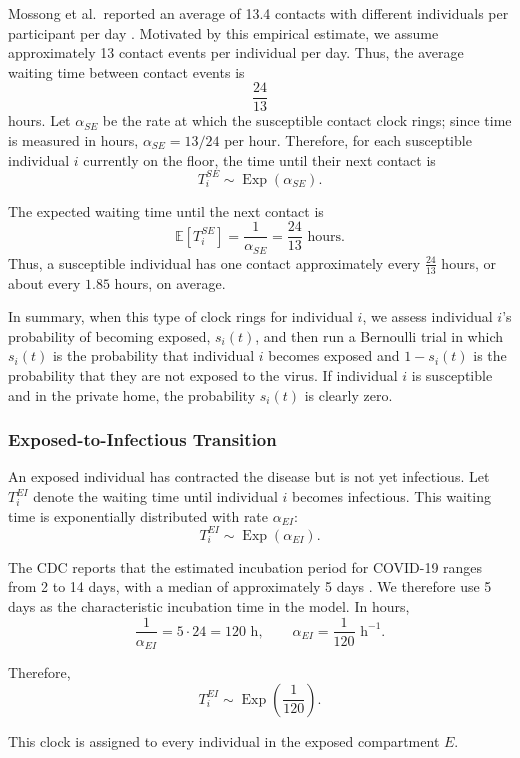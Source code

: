 \documentclass[11pt]{article}
\theoremstyle{definition}
\theoremstyle{plain}
\begin{document}
Mossong et al.\ reported an average of 13.4 contacts with different
individuals per participant per day \cite{mossong2008}. Motivated by this
empirical estimate, we assume approximately 13 contact events per individual per day. Thus, the average waiting time between contact events is
\[
\frac{24}{13}
\]
hours. Let $\alpha_{SE}$ be the rate at which the susceptible contact clock rings; since time is measured in hours, $\alpha_{SE}=13/24$ per hour. Therefore, for each susceptible individual $i$ currently on the floor, the time until
their next contact is
\[
T_i^{SE}
\sim
\operatorname{Exp}(\alpha_{SE}).
\]

The expected waiting time until the next contact is
\[
\mathbb{E}\left[T_i^{SE}\right]
=
\frac{1}{\alpha_{SE}}
=
\frac{24}{13}\text{ hours}.
\]
Thus, a susceptible individual has one contact approximately every $\frac{24}{13}$
hours, or about every $1.85$ hours, on average.

In summary, when this type of clock rings for individual $i$, we assess individual $i$'s probability of becoming exposed, $s_i(t)$, and then run a Bernoulli trial in which $s_i(t)$ is the probability that individual $i$ becomes exposed and $1-s_i(t)$ is the probability that they are not exposed to the virus. If individual $i$ is susceptible and in the private home, the probability $s_i(t)$ is clearly zero.

\subsubsection{Exposed-to-Infectious Transition}
\label{sec:ei}

An exposed individual has contracted the disease but is not yet infectious. Let $T_i^{EI}$ denote the waiting time until individual $i$ becomes infectious. This waiting time is exponentially distributed with rate $\alpha_{EI}$:
\[
T_i^{EI}\sim\operatorname{Exp}(\alpha_{EI}).
\]

The CDC reports that the estimated incubation period for COVID-19 ranges
from 2 to 14 days, with a median of approximately 5 days
\cite{cdcincubation}. We therefore use 5 days as the characteristic
incubation time in the model. In hours,
\[
\frac{1}{\alpha_{EI}}=5\cdot 24=120\text{ h},
\qquad
\alpha_{EI}=\frac{1}{120}\text{ h}^{-1}.
\]

Therefore,
\[
T_i^{EI}\sim\operatorname{Exp}\left(\frac{1}{120}\right).
\]

This clock is assigned to every individual in the exposed compartment $E$.
\end{document}
